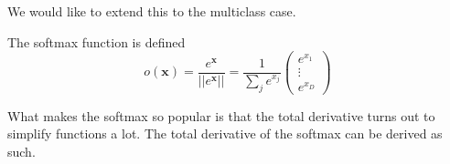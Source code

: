 \documentclass{article}
\begin{document}
    We would like to extend this to the multiclass case. 

    \begin{definition}
      The softmax function is defined 
      \begin{equation}
      o(\mathbf{x}) = \frac{e^{\mathbf{x}}}{||e^{\mathbf{x}}||} = \frac{1}{\sum_j e^{x_j}}\begin{pmatrix} e^{x_1} \\ \vdots \\ e^{x_D} \end{pmatrix}
      \end{equation}
    \end{definition}

    What makes the softmax so popular is that the total derivative turns out to simplify functions a lot. The total derivative of the softmax can be derived as such. 
\end{document}

